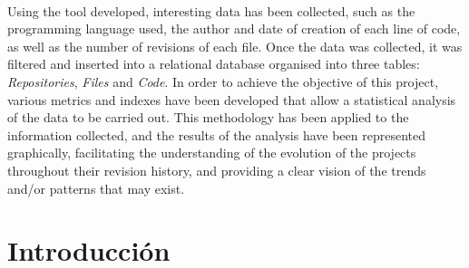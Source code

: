 \documentclass[a4paper, 12pt]{book}
\begin{document}
\\Using the tool developed, interesting data has been collected, such as the programming language used, the author and date of creation of each
line of code, as well as the number of revisions of each file. Once the data was collected, it was filtered and inserted into a relational database
organised into three tables: \textit{Repositories}, \textit{Files} and \textit{Code}. In order to achieve the objective of this project, various
metrics and indexes have been developed that allow a statistical analysis of the data to be carried out. This methodology has been applied to the
information collected, and the results of the analysis have been represented graphically, facilitating the understanding of the evolution of the
projects throughout their revision history, and providing a clear vision of the trends and/or patterns that may exist.



\tableofcontents 
\cleardoublepage
\listoffigures %
\cleardoublepage
\listoftables %



\cleardoublepage
\chapter{Introducción}
\label{chap:introducción}
\label{sec:intro} %
\end{document}
